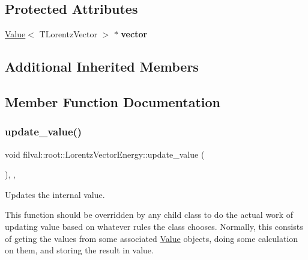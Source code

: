 \subsection*{Protected Attributes}
\begin{DoxyCompactItemize}
\item 
\hypertarget{classfilval_1_1root_1_1LorentzVectorEnergy_ae7133d089ceebfce26206844c4899c7d}{}\label{classfilval_1_1root_1_1LorentzVectorEnergy_ae7133d089ceebfce26206844c4899c7d} 
\hyperlink{classfilval_1_1Value}{Value}$<$ T\+Lorentz\+Vector $>$ $\ast$ {\bfseries vector}
\end{DoxyCompactItemize}
\subsection*{Additional Inherited Members}


\subsection{Member Function Documentation}
\hypertarget{classfilval_1_1root_1_1LorentzVectorEnergy_acb8982a0909dbb00a5ff4c38047d5115}{}\label{classfilval_1_1root_1_1LorentzVectorEnergy_acb8982a0909dbb00a5ff4c38047d5115} 
\subsubsection{\texorpdfstring{update\+\_\+value()}{update\_value()}}
{\footnotesize\ttfamily void filval\+::root\+::\+Lorentz\+Vector\+Energy\+::update\+\_\+value (\begin{DoxyParamCaption}{ }\end{DoxyParamCaption})\hspace{0.3cm}{\ttfamily [inline]}, {\ttfamily [protected]}, {\ttfamily [virtual]}}



Updates the internal value. 

This function should be overridden by any child class to do the actual work of updating value based on whatever rules the class chooses. Normally, this consists of geting the values from some associated \hyperlink{classfilval_1_1Value}{Value} objects, doing some calculation on them, and storing the result in value. 

